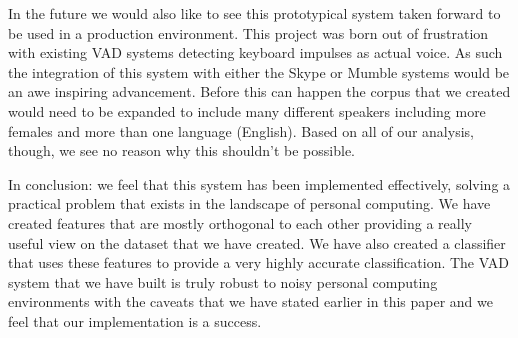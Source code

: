 \documentclass[ %
                    author={Sam Phippen},
                supervisor={Dr. Rafal Bogacz},
                     title={Real time voice activity detectors in noisy personal computing environments},
                  subtitle={},
                    degree={MEng},
                      year={2012} ]{thesis}
\begin{document}
In the future we would also like to see this prototypical system taken forward
to be used in a production environment. This project was born out of
frustration with existing VAD systems detecting keyboard impulses as actual
voice. As such the integration of this system with either the Skype or Mumble
systems would be an awe inspiring advancement. Before this can happen the
corpus that we created would need to be expanded to include many different
speakers including more females and more than one language (English). Based on
all of our analysis, though, we see no reason why this shouldn't be possible.

In conclusion: we feel that this system has been implemented effectively,
solving a practical problem that exists in the landscape of personal computing.
We have created features that are mostly orthogonal to each other providing a
really useful view on the dataset that we have created. We have also created a
classifier that uses these features to provide a very highly accurate
classification. The VAD system that we have built is truly robust to noisy
personal computing environments with the caveats that we have stated earlier in
this paper and we feel that our implementation is a success.


%
%
\end{document}
